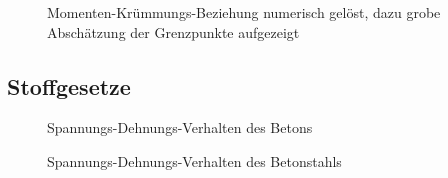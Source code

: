 \documentclass[
  11pt,
  letterpaper,
]{scrreprt}
\begin{document}
\begin{figure}[H]


\caption{\label{fig-m_chi_schaetzung}Momenten-Krümmungs-Beziehung
numerisch gelöst, dazu grobe Abschätzung der Grenzpunkte aufgezeigt}

\end{figure}%

\subsection{Stoffgesetze}\label{stoffgesetze}

\begin{figure}[H]


\caption{\label{fig-sigma_epc_t6}Spannungs-Dehnungs-Verhalten des
Betons}

\end{figure}%

\begin{figure}[H]


\caption{\label{fig-sigma_eps_t6}Spannungs-Dehnungs-Verhalten des
Betonstahls}

\end{figure}%
\end{document}
